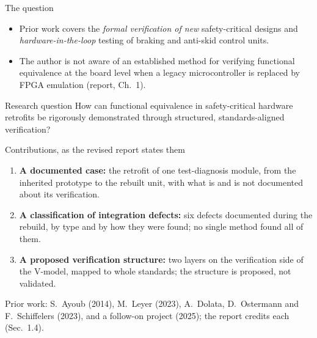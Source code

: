 \begin{frame}{The question}
  \begin{itemize}
    \item Prior work covers the \emph{formal verification of new} safety-critical designs and \emph{hardware-in-the-loop} testing of braking and anti-skid control units.
    \item The author is not aware of an established method for verifying functional equivalence \alert{at the board level} when a legacy microcontroller is replaced by FPGA emulation (report, Ch.~1).
  \end{itemize}
  \vfill
  \begin{block}{Research question}
    How can functional equivalence in safety-critical hardware retrofits be rigorously demonstrated through structured, standards-aligned verification?
  \end{block}
\end{frame}

\begin{frame}{Contributions, as the revised report states them}
  \begin{enumerate}
    \item \textbf{A documented case:} the retrofit of one test-diagnosis module, from the inherited prototype to the rebuilt unit, with what is and is not documented about its verification.
    \item \textbf{A classification of integration defects:} six defects documented during the rebuild, by type and by how they were found; no single method found all of them.
    \item \textbf{A proposed verification structure:} two layers on the verification side of the V-model, mapped to whole standards; the structure is proposed, not validated.
  \end{enumerate}
  \footnotesize Prior work: S.~Ayoub (2014), M.~Leyer (2023), A.~Dolata, D.~Ostermann and F.~Schiffelers (2023), and a follow-on project (2025); the report credits each (Sec.~1.4).
\end{frame}

